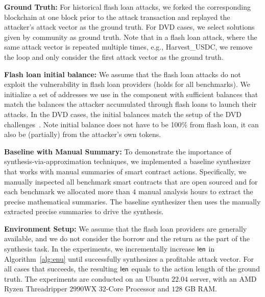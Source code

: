 \noindent \textbf{Ground Truth:} For historical flash loan attacks, we forked
the corresponding blockchain at one block prior to the attack transaction and
replayed the attacker's attack vector as the ground truth. For DVD cases, we
select solutions given by community as ground truth. Note that in a flash loan
attack, where the same attack vector is repeated multiple times, e.g.,
Harvest\_USDC, we remove the loop and only consider the first attack vector as
the ground truth. 

\noindent \textbf{Flash loan initial balance:} We assume that the flash loan
attacks do not exploit the vulnerability in flash loan providers (holds for all
benchmarks). We initialize a set of addresses we use in the {\runner} component
with sufficient balances that match the balances the attacker accumulated
through flash loans to launch their attacks. In the DVD cases, the initial
balances match the setup of the DVD challenges~\cite{DVD}.
Note initial balance does not have to be 100\% from flash loan, it can also be (partially) 
from the attacker's own tokens.    


\noindent \textbf{Baseline with Manual Summary:} To demonstrate the importance
of synthesis-via-approximation techniques, we implemented a baseline
synthesizer that works with manual summaries of smart contract actions.
Specifically, we manually inspected all benchmark smart contracts that are open
sourced and for each benchmark we allocated more than $4$ manual analysis hours
to extract the precise mathematical summaries. The baseline synthesizer then
uses the manually extracted precise summaries to drive the synthesis.

\noindent \textbf{Environment Setup:} 
We assume that the flash loan providers are generally available, and we do not
consider the borrow and the return as the part of the synthesis task. In the
experiments, we incrementally increase $\mathsf{len}$ in Algorithm~\ref{alg:enu} until
{\name} successfully synthesizes a profitable attack vector. For all cases that
{\name} succeeds, the resulting $\mathsf{len}$ equals to the action length of the
ground truth. The experiments are conducted on an Ubuntu $22.04$ server, with
an AMD Ryzen Threadripper 2990WX $32$-Core Processor and $128$ GB RAM. 
